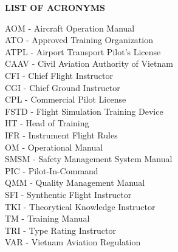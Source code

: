 \documentclass[a4paper,13pt]{report}
\begin{document}
    \newpage
    \thispagestyle{plain}
    \justifying
    \centerline{\textbf{\huge{LIST OF ACRONYMS}}}
    \begin{flushleft}
        AOM - Aircraft Operation Manual \\
        \vspace{3mm}
        ATO - Approved Training Organization \\
        \vspace{3mm}
        ATPL - Airport Transport Pilot's License \\
        \vspace{3mm}
        CAAV - Civil Aviation Authority of Vietnam \\
        \vspace{3mm}
        CFI - Chief Flight Instructor \\ 
        \vspace{3mm}
        CGI - Chief Ground Instructor \\ 
        \vspace{3mm}
        CPL - Commercial Pilot License \\ 
        \vspace{3mm}
        FSTD - Flight Simulation Training Device \\ 
        \vspace{3mm}
        HT - Head of Training \\ 
        \vspace{3mm}
        IFR - Instrument Flight Rules \\ 
        \vspace{3mm}
        OM - Operational Manual \\ 
        \vspace{3mm}
        SMSM - Safety Management System Manual \\ 
        \vspace{3mm}
        PIC - Pilot-In-Command \\ 
        \vspace{3mm}
        QMM - Quality Management Manual \\ 
        \vspace{3mm}
        SFI - Synthentic Flight Instructor \\ 
        \vspace{3mm}
        TKI - Theorytical Knowledge Instructor \\ 
        \vspace{3mm}
        TM - Training Manual \\ 
        \vspace{3mm}
        TRI - Type Rating Instructor \\ 
        \vspace{3mm}
        VAR - Vietnam Aviation Regulation
    \end{flushleft}
\end{document}
